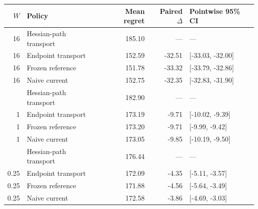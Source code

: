 \begin{tabular}{@{}rlrrl@{}}
\toprule
$W$ & Policy & Mean regret & Paired $\Delta$ & Pointwise 95\% CI \\
\midrule
16 & Hessian-path transport & 185.10 & --- & --- \\
16 & Endpoint transport & 152.59 & -32.51 & [-33.03, -32.00] \\
16 & Frozen reference & 151.78 & -33.32 & [-33.79, -32.86] \\
16 & Naive current & 152.75 & -32.35 & [-32.83, -31.90] \\
\addlinespace
1 & Hessian-path transport & 182.90 & --- & --- \\
1 & Endpoint transport & 173.19 & -9.71 & [-10.02, -9.39] \\
1 & Frozen reference & 173.20 & -9.71 & [-9.99, -9.42] \\
1 & Naive current & 173.05 & -9.85 & [-10.19, -9.50] \\
\addlinespace
0.25 & Hessian-path transport & 176.44 & --- & --- \\
0.25 & Endpoint transport & 172.09 & -4.35 & [-5.11, -3.57] \\
0.25 & Frozen reference & 171.88 & -4.56 & [-5.64, -3.49] \\
0.25 & Naive current & 172.58 & -3.86 & [-4.69, -3.03] \\
\bottomrule
\end{tabular}
